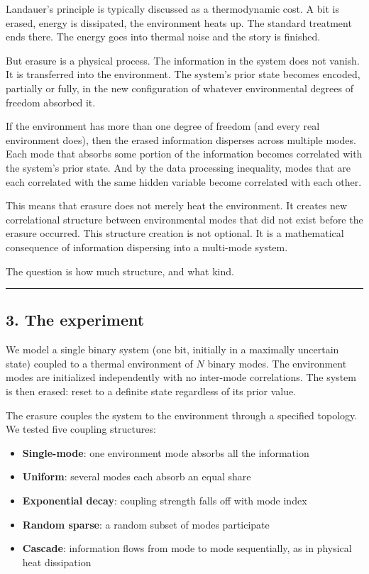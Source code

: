 \documentclass[
  11pt,
  a4paper]{article}
\providecommand{\tightlist}{%
  \setlength{\itemsep}{0pt}\setlength{\parskip}{0pt}}
\begin{document}
Landauer's principle is typically discussed as a thermodynamic cost. A
bit is erased, energy is dissipated, the environment heats up. The
standard treatment ends there. The energy goes into thermal noise and
the story is finished.

But erasure is a physical process. The information in the system does
not vanish. It is transferred into the environment. The system's prior
state becomes encoded, partially or fully, in the new configuration of
whatever environmental degrees of freedom absorbed it.

If the environment has more than one degree of freedom (and every real
environment does), then the erased information disperses across multiple
modes. Each mode that absorbs some portion of the information becomes
correlated with the system's prior state. And by the data processing
inequality, modes that are each correlated with the same hidden variable
become correlated with each other.

This means that erasure does not merely heat the environment. It creates
new correlational structure between environmental modes that did not
exist before the erasure occurred. This structure creation is not
optional. It is a mathematical consequence of information dispersing
into a multi-mode system.

The question is how much structure, and what kind.

\begin{center}\rule{0.5\linewidth}{0.5pt}\end{center}

\subsection{3. The experiment}\label{the-experiment}

We model a single binary system (one bit, initially in a maximally
uncertain state) coupled to a thermal environment of \(N\) binary modes.
The environment modes are initialized independently with no inter-mode
correlations. The system is then erased: reset to a definite state
regardless of its prior value.

The erasure couples the system to the environment through a specified
topology. We tested five coupling structures:

\begin{itemize}
\tightlist
\item
  \textbf{Single-mode}: one environment mode absorbs all the information
\item
  \textbf{Uniform}: several modes each absorb an equal share
\item
  \textbf{Exponential decay}: coupling strength falls off with mode
  index
\item
  \textbf{Random sparse}: a random subset of modes participate
\item
  \textbf{Cascade}: information flows from mode to mode sequentially, as
  in physical heat dissipation
\end{itemize}
\end{document}
